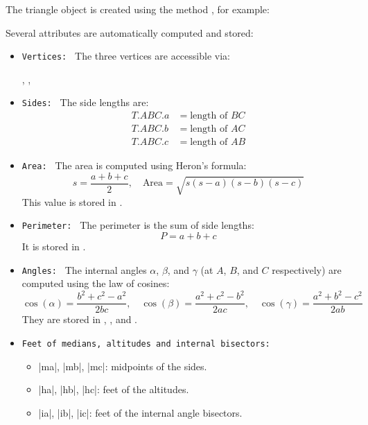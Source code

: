 The triangle object is created using the method , for example:

\begin{center}
\end{center}

Several attributes are automatically computed and stored:

\begin{itemize}
  \item \texttt{Vertices: } The three vertices are accessible via:
  \begin{center}
    , , 
  \end{center}

  \item \texttt{Sides: } The side lengths are:
  \begin{align*}
    T.ABC.a &= \text{length of } BC \\
    T.ABC.b &= \text{length of } AC \\
    T.ABC.c &= \text{length of } AB
  \end{align*}

  \item \texttt{Area: } The area is computed using Heron’s formula:
  \[
    s = \frac{a + b + c}{2}, \quad \text{Area} = \sqrt{s(s - a)(s - b)(s - c)}
  \]
  This value is stored in .

  \item \texttt{Perimeter: } The perimeter is the sum of side lengths:
  \[
    P = a + b + c
  \]
  It is stored in .

  \item \texttt{Angles: } The internal angles $\alpha$, $\beta$, and $\gamma$ (at $A$, $B$, and $C$ respectively) are computed using the law of cosines:
  \[
  \cos(\alpha) = \frac{b^2 + c^2 - a^2}{2bc}, \quad
  \cos(\beta) = \frac{a^2 + c^2 - b^2}{2ac}, \quad
  \cos(\gamma) = \frac{a^2 + b^2 - c^2}{2ab}
  \]
  They are stored in , , and .

  \item \texttt{Feet of medians, altitudes and internal bisectors: }
  \begin{itemize}
    \item |ma|, |mb|, |mc|: midpoints of the sides.
    \item |ha|, |hb|, |hc|: feet of the altitudes.
    \item |ia|, |ib|, |ic|: feet of the internal angle bisectors.
  \end{itemize}
\end{itemize}


